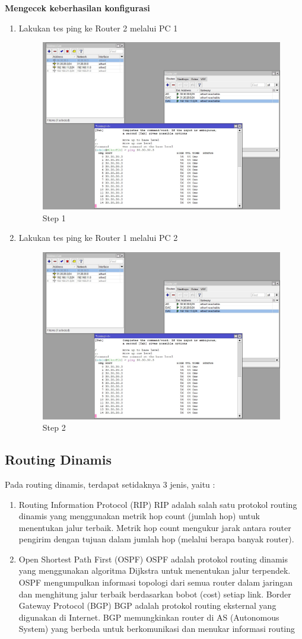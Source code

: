 \begin{center} 
	\textbf{Mengecek keberhasilan konfigurasi}
\end{center}

\begin{enumerate}
	\item Lakukan tes ping ke Router 2 melalui PC 1
	\begin{figure}[H]
		\centering
		\includegraphics[width=0.5\linewidth]{P2/img/statis_ping.jpg}
		\caption{Step 1}
		\label{fig:gambar8}
	\end{figure}

	\item Lakukan tes ping ke Router 1 melalui PC 2
	\begin{figure}[H]
		\centering
		\includegraphics[width=0.5\linewidth]{P2/img/statis_ping.jpg}
		\caption{Step 2}
		\label{fig:gambar9}
	\end{figure}

\end{enumerate}

\subsection{Routing Dinamis}
Pada routing dinamis, terdapat setidaknya 3 jenis, yaitu :
\begin{enumerate}
	\item Routing Information Protocol (RIP) RIP adalah salah satu protokol routing dinamis yang menggunakan metrik hop count (jumlah hop) untuk menentukan jalur terbaik. Metrik hop count mengukur jarak antara router pengirim dengan tujuan dalam jumlah hop (melalui berapa banyak router).
	\item Open Shortest Path First (OSPF) OSPF adalah protokol routing dinamis yang menggunakan
	algoritma Dijkstra untuk menentukan jalur terpendek. OSPF mengumpulkan informasi topologi
	dari semua router dalam jaringan dan menghitung jalur terbaik berdasarkan bobot (cost) setiap
	link.
	Border Gateway Protocol (BGP) BGP adalah protokol routing eksternal yang digunakan di Internet. BGP memungkinkan router di AS (Autonomous System) yang berbeda untuk berkomunikasi dan menukar informasi routing
\end{enumerate}

